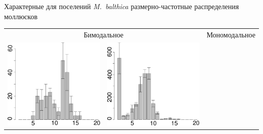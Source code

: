 \documentclass{beamer}
\begin{document}
\begin{frame}{Характерные для поселений {\it M.~balthica} размерно-частотные распределения моллюсков}
	\begin{tabularx}{\linewidth}{XX|XX}
		\multicolumn{2}{c|}{\footnotesize Бимодальное} & \multicolumn{2}{c}{\footnotesize Мономодальное} \\
			\includegraphics[width=\linewidth]{sizestr2_1997_.pdf} & 
			\includegraphics[width=\linewidth]{sizestr2_2003_.pdf} & 

\end{tabularx}
\end{frame}
\end{document}
